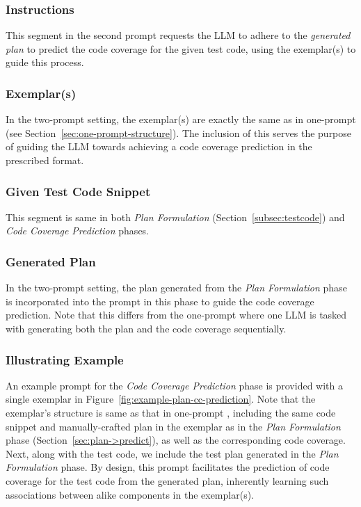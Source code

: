 \subsubsection*{Instructions} This segment in the second prompt requests the LLM to adhere to the {\em generated plan} to predict the code coverage for the given test code, using the exemplar(s) to guide this process. 

\subsubsection*{Exemplar(s)} In the two-prompt setting, the exemplar(s) are exactly the same as in one-prompt {\tool} (see Section~\ref{sec:one-prompt-structure}). The inclusion of this serves the purpose of guiding the LLM towards achieving a code coverage prediction in the prescribed format.

\subsubsection*{Given Test Code Snippet} This segment is same in both \textit{Plan Formulation} (Section~\ref{subsec:testcode}) and \textit{Code Coverage Prediction} phases.

\subsubsection*{Generated Plan} In the two-prompt setting, the plan generated from the \textit{Plan Formulation} phase is incorporated into the prompt in this phase to guide the code coverage prediction. Note that this differs from the one-prompt {\tool} where one LLM is tasked with generating both the plan and the code coverage sequentially.

\subsubsection{Illustrating Example}\label{cpm_example-2}
An example prompt for the \textit{Code Coverage Prediction} phase is provided with a single exemplar in Figure~\ref{fig:example-plan-cc-prediction}. Note that the exemplar's structure is same as that in one-prompt {\tool}, including the same code snippet and manually-crafted plan in the exemplar as in the \textit{Plan Formulation} phase (Section~\ref{sec:plan->predict}), as well as the corresponding code coverage. Next, along with the test code, we include the test plan generated in the \textit{Plan Formulation} phase. By design, this prompt facilitates the 
prediction of code coverage for the test code from the generated plan, inherently learning such associations between alike components in the exemplar(s).

